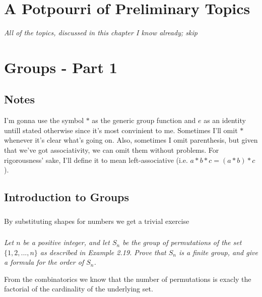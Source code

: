 \documentclass[11pt,oneside,titlepage]{book}
\newcommand{\set}[1]{\{ #1 \}}
\begin{document}
\chapter{A Potpourri of Preliminary Topics}

\textit{All of the topics, discussed in this chapter I know already;
skip}

\chapter{Groups - Part 1}

\section*{Notes}

I'm gonna use the symbol $*$ as the generic group function and $e$ as
an identity untill stated otherwise since it's most convinient to me.
Sometimes I'll omit $*$ whenever it's clear what's going on. Also,
sometimes I omit parenthesis, but given that we've got associativity,
we can omit them without problems. For rigorousness' sake, I'll define
it to mean left-associative (i.e. $a * b * c = (a * b) * c$).

\section{Introduction to Groups}

\subsection{}

By substituting shapes for numbers we get a trivial exercise


\subsection{}

\textit{Let $n$ be a positive integer, and let $S_n$ be the group of
permutations of the set $\set{1, 2, ... , n}$ as described in Example
2.19. Prove that $S_n$ is a finite group, and give a formula for the
order of $S_n$.}

From the combinatorics we know that the number of permutations is
exacly the factorial of the cardinality of the underlying set.

\subsection{}
\end{document}
